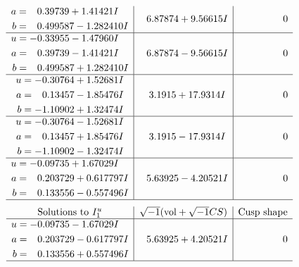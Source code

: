 \documentclass[1p]{elsarticle_modified}
\theoremstyle{definition}
\newcommand{\I}{\sqrt{-1}}
\begin{document}
$$\begin{array}{c|c|c}
\begin{aligned}
a &= \phantom{-}0.39739 + 1.41421 I \\
b &= \phantom{-}0.499587 - 1.282410 I\end{aligned}
 & \phantom{-}6.87874 + 9.56615 I & \phantom{-0.000000 } 0 \\ \hline\begin{aligned}
u &= -0.33955 - 1.47960 I \\
a &= \phantom{-}0.39739 - 1.41421 I \\
b &= \phantom{-}0.499587 + 1.282410 I\end{aligned}
 & \phantom{-}6.87874 - 9.56615 I & \phantom{-0.000000 } 0 \\ \hline\begin{aligned}
u &= -0.30764 + 1.52681 I \\
a &= \phantom{-}0.13457 - 1.85476 I \\
b &= -1.10902 + 1.32474 I\end{aligned}
 & \phantom{-}3.1915 + 17.9314 I & \phantom{-0.000000 } 0 \\ \hline\begin{aligned}
u &= -0.30764 - 1.52681 I \\
a &= \phantom{-}0.13457 + 1.85476 I \\
b &= -1.10902 - 1.32474 I\end{aligned}
 & \phantom{-}3.1915 - 17.9314 I & \phantom{-0.000000 } 0 \\ \hline\begin{aligned}
u &= -0.09735 + 1.67029 I \\
a &= \phantom{-}0.203729 + 0.617797 I \\
b &= \phantom{-}0.133556 - 0.557496 I\end{aligned}
 & \phantom{-}5.63925 - 4.20521 I & \phantom{-0.000000 } 0\\
 \hline 
 \end{array}$$\newpage$$\begin{array}{c|c|c}  
\text{Solutions to }I^u_{1}& \I (\text{vol} + \sqrt{-1}CS) & \text{Cusp shape}\\
 \hline 
\begin{aligned}
u &= -0.09735 - 1.67029 I \\
a &= \phantom{-}0.203729 - 0.617797 I \\
b &= \phantom{-}0.133556 + 0.557496 I\end{aligned}
 & \phantom{-}5.63925 + 4.20521 I & \phantom{-0.000000 } 0\\
 \hline 
 \end{array}$$\newpage\newpage\renewcommand{\arraystretch}{1}
\end{document}

